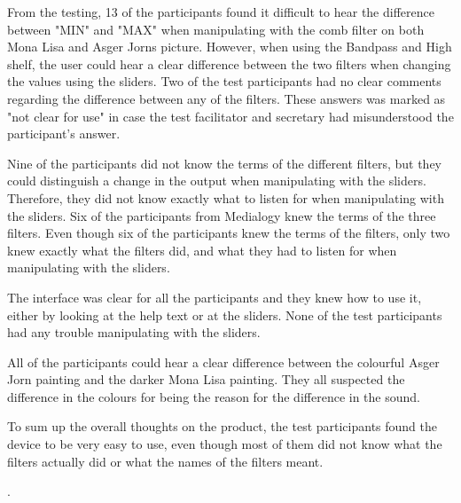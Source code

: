 From the testing, 13 of the participants found it difficult to hear the difference between "MIN" and "MAX" when manipulating with the comb filter on both Mona Lisa and Asger Jorns picture. However, when using the Bandpass and High shelf, the user could hear a clear difference between the two filters when changing the values using the sliders. Two of the test participants had no clear comments regarding the difference between any of the filters. These answers was marked as "not clear for use" in case the test facilitator and secretary had misunderstood the participant's answer. 

Nine of the participants did not know the terms of the different filters, but they could distinguish a change in the output when manipulating with the sliders. Therefore, they did not know exactly what to listen for when manipulating with the sliders. Six of the participants from Medialogy knew the terms of the three filters. Even though six of the participants knew the terms of the filters, only two knew exactly what the filters did, and what they had to listen for when manipulating with the sliders. 

The interface was clear for all the participants and they knew how to use it, either by looking at the help text or at the sliders. None of the test participants had any trouble manipulating with the sliders. 

All of the participants could hear a clear difference between the colourful Asger Jorn painting and the darker Mona Lisa painting. They all suspected the difference in the colours for being the reason for the difference in the sound. 

To sum up the overall thoughts on the product, the test participants found the device to be very easy to use, even though most of them did not know what the filters actually did or what the names of the filters meant. 

. 